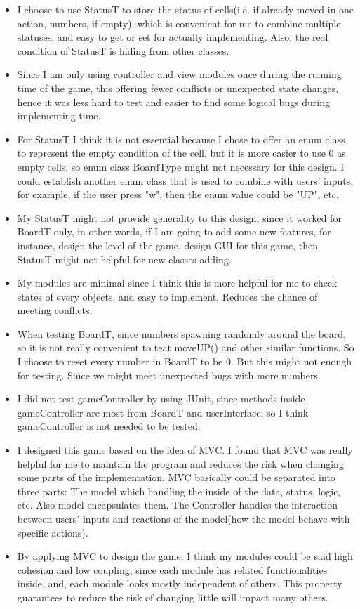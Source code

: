 \documentclass[12pt]{article}
\begin{document}
\begin{itemize}
  \item I choose to use StatusT to store the status of cells(i.e. if already moved in one action, numbers, if empty), which is convenient for
        me to combine multiple statuses, and easy to get or set for actually implementing. Also, the real condition of StatusT is hiding
        from other classes.
  \item Since I am only using controller and view modules once during the running time of the game, this offering fewer conflicts or unexpected state changes, 
        hence it was less hard to test and easier to find some logical bugs during implementing time.
  \item For StatusT I think it is not essential because I chose to offer an enum class to represent the empty condition of the cell, but it is more
        easier to use 0 as empty cells, so enum class BoardType might not necessary for this design. I could establish another enum class that is used
        to combine with users' inputs, for example, if the user press "w", then the enum value could be "UP", etc.
  \item My StatusT might not provide generality to this design, since it worked for BoardT only, in other words, if I am going to add some new
        features, for instance, design the level of the game, design GUI for this game, then StatusT might not helpful for new classes adding.
  \item My modules are minimal since I think this is more helpful for me to check states of every objects, and easy to implement. Reduces the chance of
        meeting conflicts.
  \item When testing BoardT, since numbers spawning randomly around the board, so it is not really convenient to teat moveUP() and other similar functions.
        So I choose to reset every number in BoardT to be 0. But this might not enough for testing. Since we might meet unexpected bugs with more numbers.
  \item I did not test gameController by using JUnit, since methods inside gameController are most from BoardT and userInterface, so I think gameController
        is not needed to be tested.
  \item I designed this game based on the idea of MVC. I found that MVC was really helpful for me to maintain the program and reduces the risk when changing some
        parts of the implementation. MVC basically could be separated into three parts: The model which handling the inside of the data, status, logic, etc. Also
        model encapsulates them. The Controller handles the interaction between users' inputs and reactions of the model(how the model behave with specific actions).
  \item By applying MVC to design the game, I think my modules could be said high cohesion and low coupling, since each module has related functionalities inside,
        and, each module looks mostly independent of others. This property guarantees to reduce the risk of changing little will impact many others.
  
\end{itemize}
\end{document}

